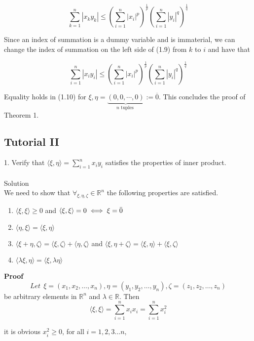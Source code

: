\documentclass{article}
\begin{document}
$$
\sum_{k=1}^{n}\left|x_{k} y_{k}\right| \leq\left(\sum_{i=1}^{n}\left|x_{i}\right|^{p}\right)^{\frac{1}{p}}\left(\sum_{i=1}^{n}\left|y_{i}\right|^{q}\right)^{\frac{1}{q}}
$$

Since an index of summation is a dummy variable and is immaterial, we can change the index of summation on the left side of (1.9) from $k$ to $i$ and have that

$$
\sum_{i=1}^{n}\left|x_{i} y_{i}\right| \leq\left(\sum_{i=1}^{n}\left|x_{i}\right|^{p}\right)^{\frac{1}{p}}\left(\sum_{i=1}^{n}\left|y_{i}\right|^{q}\right)^{\frac{1}{q}}
$$

Equality holds in (1.10) for $\xi, \eta=\underbrace{(0,0, \cdots, 0)}_{n \text { tuples }}:=\overline{0}$. This concludes the proof of Theorem 1.


\newpage
\subsection{Tutorial II}
\large{}
1. Verify that $
\langle\xi, \eta\rangle=\sum_{i=1}^{n} x_{i} y_{i}$
satisfies the properties of inner product.\\\\
\Large{Solution}\\
We need to show that $\forall_{\xi,\eta,\zeta}\in \mathbb{R}^n$ the following properties are satisfied.
\begin{enumerate}
  \item $\langle\xi, \xi\rangle \geq 0$ and $\langle\xi, \xi\rangle= 0 \iff \xi= \Bar{0}$
  \item $\langle\eta, \xi\rangle=\langle\xi, \eta\rangle$
  \item $\langle\xi+\eta, \zeta\rangle =\langle\xi, \zeta\rangle+\langle\eta, \zeta\rangle$ and $\langle\xi, \eta+\zeta\rangle=\langle\xi, \eta\rangle +\langle\xi,\zeta\rangle$
   \item $\langle\lambda \xi, \eta\rangle=\langle\xi, \lambda \eta\rangle $
  
\end{enumerate}
 \textbf{Proof}\\

$$Let~~\xi=\left(x_{1}, x_{2}, \ldots, x_{n}\right), \eta=\left(y_{1}, y_{2}, \ldots, y_{n}\right), \zeta=\left(z_{1}, z_{2}, \ldots, z_{n}\right)$$ be arbitrary elements in $\mathbb{R}^{n}$ and $\lambda \in \mathbb{R}$. Then
$$
\langle\xi, \xi\rangle=\sum_{i=1}^{n} x_{i} x_{i}=\sum_{i=1}^{n} x_{i}^{2}
$$

it is obvious $x_{i}^{2} \geq 0$, for all $i=1, 2, 3...n$,\\
\end{document}

